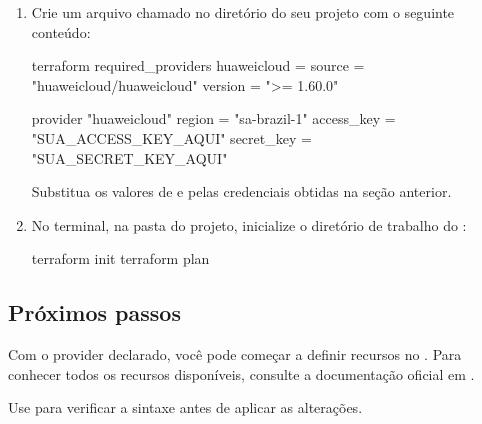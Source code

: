 \documentclass{guide}
\begin{document}
\passoapasso
\begin{enumerate}
  \item Crie um arquivo chamado  no diretório do seu
        projeto com o seguinte conteúdo:

\begin{codigo}
terraform {
  required_providers {
    huaweicloud = {
      source  = "huaweicloud/huaweicloud"
      version = ">= 1.60.0"
    }
  }
}

provider "huaweicloud" {
  region     = "sa-brazil-1"
  access_key = "SUA_ACCESS_KEY_AQUI"
  secret_key = "SUA_SECRET_KEY_AQUI"
}
\end{codigo}

  Substitua os valores de  e  pelas
  credenciais obtidas na seção anterior.

  \item No terminal, na pasta do projeto, inicialize o diretório de trabalho
        do :

\begin{codigo}[bash]
terraform init
terraform plan
\end{codigo}

\end{enumerate}

\subsection{Próximos passos}

Com o provider declarado, você pode começar a definir recursos no
. Para conhecer todos os recursos disponíveis, consulte a
documentação oficial em
.

\begin{dica}
Use  para verificar a sintaxe antes de aplicar
as alterações.
\end{dica}


\end{document}
